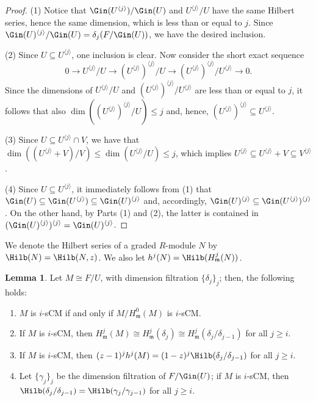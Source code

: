 \documentclass[12pt]{amsart}
\theoremstyle{definition}
\newtheorem{lemma}[theorem]{Lemma}
\theoremstyle{definition}
\newcommand{\m}{\mathfrak{m}}
\def\frk{\mathfrak}               %
\def\mm{{\frk m}}
\renewcommand{\leq}{\leqslant}
\renewcommand{\geq}{\geqslant}
\let\lra\longrightarrow
\begin{document}
\begin{proof}
(1) Notice that  $\Gin(U^{\langle j \rangle})/\Gin(U)$ and $U^{\langle j \rangle}/U$ have the same Hilbert series, hence the same dimension, which is less than or equal to $j$. Since $\Gin(U)^{\langle j \rangle}/\Gin(U)=\delta_j(F/\Gin(U))$, we have the desired inclusion. 

\smallskip
\noindent
(2) Since $U \subseteq U^{\langle j \rangle}$, one inclusion is clear. Now consider the short exact sequence
\[
0 \lra U^{\langle j \rangle}/U \lra (U^{\langle j \rangle})^{\langle j \rangle}/U \lra (U^{\langle j \rangle})^{\langle j \rangle}/U^{\langle j \rangle} \lra 0.
\]
Since the dimensions of $U^{\langle j \rangle}/U$ and $(U^{\langle j \rangle})^{\langle j \rangle}/U^{\langle j \rangle}$ are less than or equal to $j$, it follows that also $\dim((U^{\langle j \rangle})^{\langle j \rangle}/U) \leq j$ and,  hence, $(U^{\langle j \rangle})^{\langle j \rangle} \subseteq U^{\langle j \rangle}$.

\smallskip
\noindent
(3) Since $U \subseteq U^{\langle j\rangle}\cap V$, we have that $\dim((U^{ \langle j \rangle}+V)/V) \leq \dim(U^{\langle j \rangle}/U) \leq j$, which implies $U^{ \langle j \rangle}\subseteq U^{\langle j \rangle}+V \subseteq V^{\langle j \rangle}$.

\smallskip
\noindent
(4)  Since $U \subseteq U^{\langle j \rangle}$, it immediately follows from (1) that $\Gin(U) \subseteq \Gin(U^{\langle j \rangle}) \subseteq \Gin(U)^{\langle j \rangle}$ and, accordingly, 
$\Gin(U)^{\langle j \rangle} \subseteq \Gin(U^{\langle j \rangle})^{\langle j \rangle}$. On the other hand, by Parts (1) and (2), the latter is contained in  $(\Gin(U)^{\langle j \rangle})^{\langle j \rangle}=\Gin(U)^{\langle j \rangle}$.
\end{proof}

We denote the Hilbert series of a graded $R$-module $N$ by $\Hilb(N)=\Hilb(N,z)$. We also let $h^j(N) = \Hilb(H^j_\m(N))$.

\begin{lemma}\label{lemma SbSt}
Let $M \cong F/U$, with dimension filtration $\{\delta_j\}_j$; then,  the following holds:
\begin{enumerate}[(1)]
\item $M$ is $i$-sCM if and only if $M/H^{0}_\mm(M)$ is $i$-sCM.
\item If $M$ is $i$-sCM, then $H^j_\mm (M) \cong H^j_\mm(\delta_j) \cong H^j_\mm (\delta_j/\delta_{j-1})$ for all $j \geq i$.
\item If $M$ is $i$-sCM, then $(z-1)^jh^j(M)=(1-z)^j\Hilb(\delta_j/\delta_{j-1})$ for all $j \geq i$.
\item Let $\{\gamma_j\}_j$ be the dimension filtration of $F/\Gin(U)$; if $M$ is $i$-sCM, then $\Hilb(\delta_j/\delta_{j-1})=\Hilb(\gamma_j/\gamma_{j-1})$ for all $j \geq i$. 
\end{enumerate}
\end{lemma}
\end{document}
